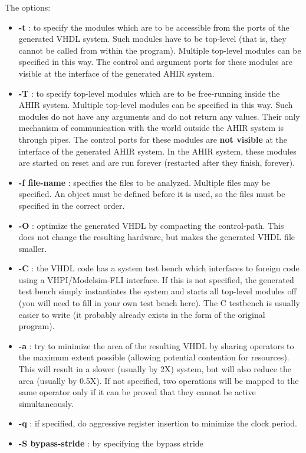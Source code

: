 The options:
\begin{itemize}
\item {\bf -t} : to specify the modules which are to be 
accessible from the ports of the generated VHDL system.
Such modules have to be top-level (that is, they cannot
be called from within the program).
Multiple top-level modules can be specified in this way.
The control and argument ports for these modules are
visible at the interface of the generated AHIR system.
\item {\bf -T} : to specify top-level modules which are to be 
free-running inside the AHIR system.
Multiple top-level modules can be specified in this way.
Such modules do not have any arguments and do not return
any values.  Their only mechanism of communication with
the world outside the AHIR system is through pipes.
The control ports for these modules are
{\bf not visible} at the interface of the generated AHIR system.
In the AHIR system, these modules are started on reset
and are run forever (restarted after they finish, forever).
\item {\bf -f file-name} : specifies the \vC files to be analyzed. 
Multiple \vC files may be specified.  An object must be
defined before it is used, so the \vC files must be 
specified in the correct order.
\item {\bf -O} : optimize the generated VHDL by compacting
the control-path.  This does not change the resulting
hardware, but makes the generated VHDL file smaller.
\item {\bf -C} : the VHDL code has a system test bench which
interfaces to foreign code using a VHPI/Modelsim-FLI interface.
If this is not specified, the  generated test bench simply
instantiates the system and starts all top-level modules
off (you will need to fill in your own test bench here).
The C testbench is usually easier to write (it probably
already exists in the form of the original program).
\item {\bf -a} : try to minimize the area of the resulting
VHDL by sharing operators to the maximum extent possible
(allowing potential contention for resources).  This will
result in a slower (usually by 2X) system, but will
also reduce the area (usually by 0.5X).  If not specified,
two operations will be mapped to the same
operator  only if it can be proved that they cannot be active simultaneously.
\item {\bf -q } : if specified, do aggressive register insertion
to minimize the clock period.
\item {\bf -S bypass-stride } : by specifying the bypass stride

\end{itemize}
